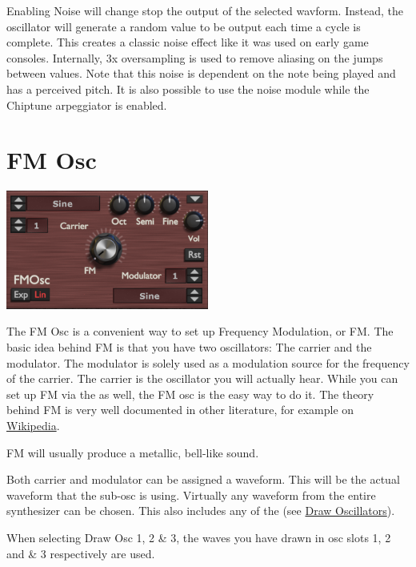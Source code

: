 {Enabling Noise will change stop the output of the selected wavform. Instead, the oscillator will generate a random value to be output each time a cycle is complete. This creates a classic noise effect like it was used on early game consoles. Internally, 3x oversampling is used to remove aliasing on the jumps between values. Note that this noise is dependent on the note being played and has a perceived pitch. It is also possible to use the noise module while the Chiptune arpeggiator is enabled.}

\section{FM Osc}
\label{fm_osc}
\begin{center}
    \includegraphics[width=0.5\textwidth]{graphics/fm_osc.png}
\end{center}
The FM Osc is a convenient way to set up Frequency Modulation, or FM. The basic idea behind FM is that you have two oscillators: The carrier and the modulator. The modulator is solely used as a modulation source for the frequency of the carrier. The carrier is the oscillator you will actually hear. While you can set up FM via the \modmatrix as well, the FM osc is the easy way to do it. The theory behind FM is very well documented in other literature, for example on \hyperlink{https://de.wikipedia.org/wiki/FM-Synthese}{Wikipedia}.

FM will usually produce a metallic, bell-like sound.

{Both carrier and modulator can be assigned a waveform. This will be the actual waveform that the sub-osc is using. Virtually any waveform from the entire synthesizer can be chosen. This also includes any of the (see \hyperref[wavedraw]{Draw Oscillators}).

When selecting  Draw Osc 1, 2 \& 3, the waves you have drawn in osc slots 1, 2 and \& 3 respectively are used.}

